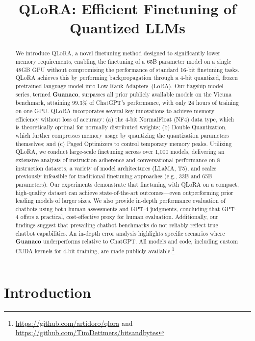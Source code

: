 \title{QLoRA: Efficient Finetuning of Quantized LLMs}

\begin{abstract}
We introduce \textsc{QLoRA}, a novel finetuning method designed to significantly lower memory requirements, enabling the finetuning of a 65B parameter model on a single 48GB GPU without compromising the performance of standard 16-bit finetuning tasks. \textsc{QLoRA} achieves this by performing backpropagation through a 4-bit quantized, frozen pretrained language model into Low Rank Adapters~(LoRA). Our flagship model series, termed \textbf{Guanaco}, surpasses all prior publicly available models on the Vicuna benchmark, attaining 99.3\% of ChatGPT's performance, with only 24 hours of training on one GPU. \textsc{QLoRA} incorporates several key innovations to achieve memory efficiency without loss of accuracy: (a) the 4-bit NormalFloat (NF4) data type, which is theoretically optimal for normally distributed weights; (b) Double Quantization, which further compresses memory usage by quantizing the quantization parameters themselves; and (c) Paged Optimizers to control temporary memory peaks. Utilizing \textsc{QLoRA}, we conduct large-scale finetuning across over 1,000 models, delivering an extensive analysis of instruction adherence and conversational performance on 8 instruction datasets, a variety of model architectures (LLaMA, T5), and scales previously infeasible for traditional finetuning approaches (e.g., 33B and 65B parameters). Our experiments demonstrate that finetuning with QLoRA on a compact, high-quality dataset can achieve state-of-the-art outcomes—even outperforming prior leading models of larger sizes. We also provide in-depth performance evaluation of chatbots using both human assessments and GPT-4 judgments, concluding that GPT-4 offers a practical, cost-effective proxy for human evaluation. Additionally, our findings suggest that prevailing chatbot benchmarks do not reliably reflect true chatbot capabilities. An in-depth error analysis highlights specific scenarios where \textbf{Guanaco} underperforms relative to ChatGPT. All models and code, including custom CUDA kernels for 4-bit training, are made publicly available.\footnote{\url{https://github.com/artidoro/qlora} and \url{https://github.com/TimDettmers/bitsandbytes}}
\end{abstract}

\section{Introduction}

